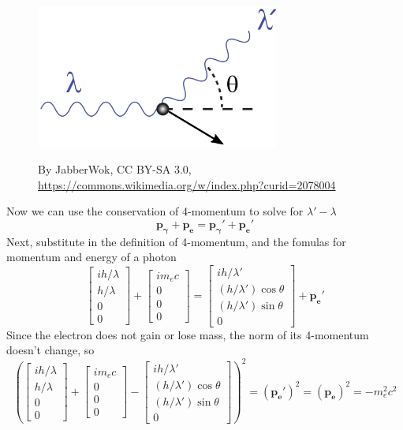\documentclass[12pt]{article}
\begin{document}
\begin{figure}[h]
\includegraphics[width=8cm]{Compton-scattering.png}
\centering

By JabberWok, CC BY-SA 3.0, \url{https://commons.wikimedia.org/w/index.php?curid=2078004}
\end{figure}
Now we can use the conservation of 4-momentum to solve for $\lambda' - \lambda$
\[ \boldsymbol{p_\gamma} + \boldsymbol{p_e} = \boldsymbol{p_\gamma '} + \boldsymbol{p_e '} \]
Next, substitute in the definition of 4-momentum, and the fomulas for momentum and energy of a photon
\[ \begin{bmatrix} i h / \lambda \\ h / \lambda \\ 0 \\ 0 \end{bmatrix}
+ \begin{bmatrix} i m_e c \\ 0 \\ 0 \\ 0 \end{bmatrix}
= \begin{bmatrix} i h / \lambda' \\ (h / \lambda') \cos \theta \\ (h / \lambda') \sin \theta \\ 0 \end{bmatrix}
+ \boldsymbol{p_e '} \]
Since the electron does not gain or lose mass, the norm of its 4-momentum doesn't change, so
\[ \left( \begin{bmatrix} i h / \lambda \\ h / \lambda \\ 0 \\ 0 \end{bmatrix}
+ \begin{bmatrix} i m_e c \\ 0 \\ 0 \\ 0 \end{bmatrix}
- \begin{bmatrix} i h / \lambda' \\ (h / \lambda') \cos \theta \\ (h / \lambda') \sin \theta \\ 0 \end{bmatrix} \right)^2
= (\boldsymbol{p_e'})^2 = (\boldsymbol{p_e})^2 = - m_e^2 c^2 \]
\end{document}
